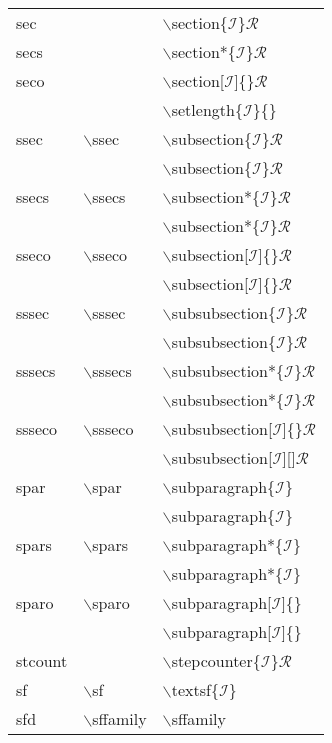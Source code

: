 \begin{longtable}{p{20mm}p{20mm}p{65mm}}
sec &  & $\backslash$section\{$\mathcal{I}$\}$\mathcal{R}$\\
secs &  & $\backslash$section*\{$\mathcal{I}$\}$\mathcal{R}$\\
seco &  & $\backslash$section[$\mathcal{I}$]\{\}$\mathcal{R}$\\
 &  & $\backslash$setlength\{$\mathcal{I}$\}\{\}\\
ssec & $\backslash$ssec & $\backslash$subsection\{$\mathcal{I}$\}$\mathcal{R}$\\
 &  & $\backslash$subsection\{$\mathcal{I}$\}$\mathcal{R}$\\
ssecs & $\backslash$ssecs & $\backslash$subsection*\{$\mathcal{I}$\}$\mathcal{R}$\\
 &  & $\backslash$subsection*\{$\mathcal{I}$\}$\mathcal{R}$\\
sseco & $\backslash$sseco & $\backslash$subsection[$\mathcal{I}$]\{\}$\mathcal{R}$\\
 &  & $\backslash$subsection[$\mathcal{I}$]\{\}$\mathcal{R}$\\
sssec & $\backslash$sssec & $\backslash$subsubsection\{$\mathcal{I}$\}$\mathcal{R}$\\
 &  & $\backslash$subsubsection\{$\mathcal{I}$\}$\mathcal{R}$\\
sssecs & $\backslash$sssecs & $\backslash$subsubsection*\{$\mathcal{I}$\}$\mathcal{R}$\\
 &  & $\backslash$subsubsection*\{$\mathcal{I}$\}$\mathcal{R}$\\
ssseco & $\backslash$ssseco & $\backslash$subsubsection[$\mathcal{I}$]\{\}$\mathcal{R}$\\
 &  & $\backslash$subsubsection[$\mathcal{I}$][]$\mathcal{R}$\\
spar & $\backslash$spar & $\backslash$subparagraph\{$\mathcal{I}$\}\\
 &  & $\backslash$subparagraph\{$\mathcal{I}$\}\\
spars & $\backslash$spars & $\backslash$subparagraph*\{$\mathcal{I}$\}\\
 &  & $\backslash$subparagraph*\{$\mathcal{I}$\}\\
sparo & $\backslash$sparo & $\backslash$subparagraph[$\mathcal{I}$]\{\}\\
 &  & $\backslash$subparagraph[$\mathcal{I}$]\{\}\\
stcount &  & $\backslash$stepcounter\{$\mathcal{I}$\}$\mathcal{R}$\\
sf & $\backslash$sf & $\backslash$textsf\{$\mathcal{I}$\}\\
sfd & $\backslash$sffamily & $\backslash$sffamily\\

\end{longtable}

